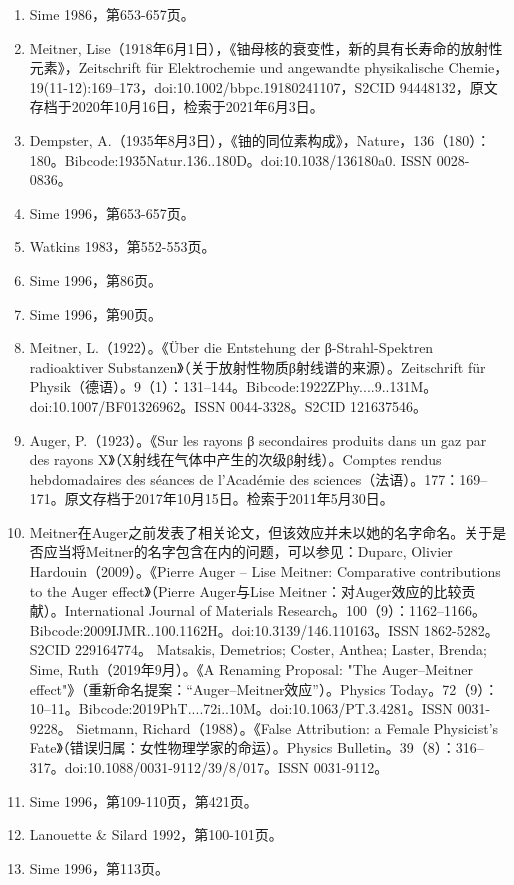 \begin{enumerate}
\item Sime 1986，第653-657页。
\item Meitner, Lise（1918年6月1日），《铀母核的衰变性，新的具有长寿命的放射性元素》，Zeitschrift für Elektrochemie und angewandte physikalische Chemie，19(11-12):169–173，doi:10.1002/bbpc.19180241107，S2CID 94448132，原文存档于2020年10月16日，检索于2021年6月3日。
\item Dempster, A.（1935年8月3日），《铀的同位素构成》，Nature，136（180）：180。Bibcode:1935Natur.136..180D。doi:10.1038/136180a0. ISSN 0028-0836。
\item Sime 1996，第653-657页。
\item Watkins 1983，第552-553页。
\item Sime 1996，第86页。
\item Sime 1996，第90页。
\item Meitner, L.（1922）。《Über die Entstehung der β-Strahl-Spektren radioaktiver Substanzen》（关于放射性物质β射线谱的来源）。Zeitschrift für Physik（德语）。9（1）：131–144。Bibcode:1922ZPhy....9..131M。doi:10.1007/BF01326962。ISSN 0044-3328。S2CID 121637546。
\item Auger, P.（1923）。《Sur les rayons β secondaires produits dans un gaz par des rayons X》（X射线在气体中产生的次级β射线）。Comptes rendus hebdomadaires des séances de l'Académie des sciences（法语）。177：169–171。原文存档于2017年10月15日。检索于2011年5月30日。
\item Meitner在Auger之前发表了相关论文，但该效应并未以她的名字命名。关于是否应当将Meitner的名字包含在内的问题，可以参见：Duparc, Olivier Hardouin（2009）。《Pierre Auger – Lise Meitner: Comparative contributions to the Auger effect》（Pierre Auger与Lise Meitner：对Auger效应的比较贡献）。International Journal of Materials Research。100（9）：1162–1166。Bibcode:2009IJMR..100.1162H。doi:10.3139/146.110163。ISSN 1862-5282。S2CID 229164774。
Matsakis, Demetrios; Coster, Anthea; Laster, Brenda; Sime, Ruth（2019年9月）。《A Renaming Proposal: "The Auger–Meitner effect"》（重新命名提案：“Auger–Meitner效应”）。Physics Today。72（9）：10–11。Bibcode:2019PhT....72i..10M。doi:10.1063/PT.3.4281。ISSN 0031-9228。
Sietmann, Richard（1988）。《False Attribution: a Female Physicist's Fate》（错误归属：女性物理学家的命运）。Physics Bulletin。39（8）：316–317。doi:10.1088/0031-9112/39/8/017。ISSN 0031-9112。
\item Sime 1996，第109-110页，第421页。
\item Lanouette & Silard 1992，第100-101页。
\item Sime 1996，第113页。

\end{enumerate}
